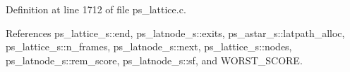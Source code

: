 Definition at line 1712 of file ps\+\_\+lattice.\+c.



References ps\+\_\+lattice\+\_\+s\+::end, ps\+\_\+latnode\+\_\+s\+::exits, ps\+\_\+astar\+\_\+s\+::latpath\+\_\+alloc, ps\+\_\+lattice\+\_\+s\+::n\+\_\+frames, ps\+\_\+latnode\+\_\+s\+::next, ps\+\_\+lattice\+\_\+s\+::nodes, ps\+\_\+latnode\+\_\+s\+::rem\+\_\+score, ps\+\_\+latnode\+\_\+s\+::sf, and W\+O\+R\+S\+T\+\_\+\+S\+C\+O\+RE.

